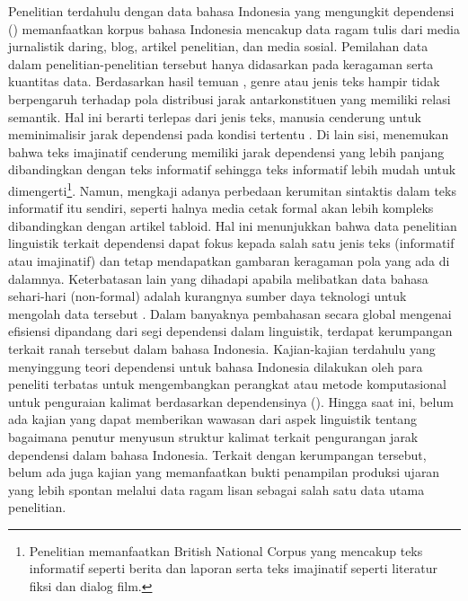 Penelitian terdahulu dengan data bahasa Indonesia yang mengungkit dependensi (\citealp{kamayani2011dependency, green2012indonesian, irmawati2015dependency, futrell2015large}) memanfaatkan korpus bahasa Indonesia mencakup data ragam tulis dari media jurnalistik daring, blog, artikel penelitian, dan media sosial. Pemilahan data dalam penelitian-penelitian tersebut hanya didasarkan pada keragaman serta kuantitas data. Berdasarkan hasil temuan \cite{wang2017effects}, genre atau jenis teks hampir tidak berpengaruh terhadap pola distribusi jarak antarkonstituen yang memiliki relasi semantik. Hal ini berarti terlepas dari jenis teks, manusia cenderung untuk meminimalisir jarak dependensi pada kondisi tertentu \citep{wang2017effects}. Di lain sisi, \citep{wang2017effects} menemukan bahwa teks imajinatif cenderung memiliki jarak dependensi yang lebih panjang dibandingkan dengan teks informatif sehingga teks informatif lebih mudah untuk dimengerti\footnote{Penelitian \cite{wang2017effects} memanfaatkan British National Corpus yang mencakup teks informatif seperti berita dan laporan serta teks imajinatif seperti literatur fiksi dan dialog film.}. Namun, \cite{miller2011critical} mengkaji adanya perbedaan kerumitan sintaktis dalam teks informatif itu sendiri, seperti halnya media cetak formal akan lebih kompleks dibandingkan dengan artikel tabloid. Hal ini menunjukkan bahwa data penelitian linguistik terkait dependensi dapat fokus kepada salah satu jenis teks (informatif atau imajinatif) dan tetap mendapatkan gambaran keragaman pola yang ada di dalamnya. Keterbatasan lain yang dihadapi apabila melibatkan data bahasa sehari-hari (non-formal) adalah kurangnya sumber daya teknologi untuk mengolah data tersebut \citep{green2012indonesian}. Dalam banyaknya pembahasan secara global mengenai efisiensi dipandang dari segi dependensi dalam linguistik, terdapat kerumpangan terkait ranah tersebut dalam bahasa Indonesia. Kajian-kajian terdahulu yang menyinggung teori dependensi untuk bahasa Indonesia dilakukan oleh para peneliti terbatas untuk mengembangkan perangkat atau metode komputasional untuk penguraian kalimat berdasarkan dependensinya (\citealp{kamayani2011dependency, green2012indonesian, irmawati2015dependency}). Hingga saat ini, belum ada kajian yang dapat memberikan wawasan dari aspek linguistik tentang bagaimana penutur menyusun struktur kalimat terkait pengurangan jarak dependensi dalam bahasa Indonesia. Terkait dengan kerumpangan tersebut, belum ada juga kajian yang memanfaatkan bukti penampilan produksi ujaran yang lebih spontan melalui data ragam lisan sebagai salah satu data utama penelitian. 



